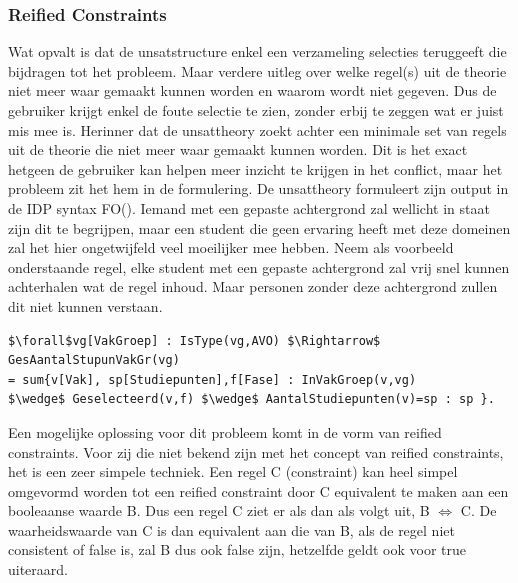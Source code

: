 \subsubsection{Reified Constraints}
\label{sec:reifiedconstraints}
Wat opvalt is dat de unsatstructure enkel een verzameling selecties teruggeeft die bijdragen tot het probleem. Maar verdere uitleg over welke regel(s) uit de theorie niet meer waar gemaakt kunnen worden en waarom wordt niet gegeven. Dus de gebruiker krijgt enkel de foute selectie te zien, zonder erbij te zeggen wat er juist mis mee is. Herinner dat de unsattheory zoekt achter een minimale set van regels uit de theorie die niet meer waar gemaakt kunnen worden. Dit is het exact hetgeen de gebruiker kan helpen meer inzicht te krijgen in het conflict, maar het probleem zit het hem in de formulering. De unsattheory formuleert zijn output in de IDP syntax FO(\textperiodcentered). Iemand met een gepaste achtergrond zal wellicht in staat zijn dit te begrijpen, maar een student die geen ervaring heeft met deze domeinen zal het hier ongetwijfeld veel moeilijker mee hebben. Neem als voorbeeld onderstaande regel, elke student met een gepaste achtergrond zal vrij snel kunnen achterhalen wat de regel inhoud. Maar personen zonder deze achtergrond zullen dit niet kunnen verstaan.
\lstset{basicstyle=\scriptsize}
\begin{lstlisting}[mathescape, caption=Voorbeeld constraint IDP\label{lst:constraint}, frame=single]
$\forall$vg[VakGroep] : IsType(vg,AVO) $\Rightarrow$ GesAantalStupunVakGr(vg) 
= sum{v[Vak], sp[Studiepunten],f[Fase] : InVakGroep(v,vg) 
$\wedge$ Geselecteerd(v,f) $\wedge$ AantalStudiepunten(v)=sp : sp }.
\end{lstlisting}
Een mogelijke oplossing voor dit probleem komt in de vorm van reified constraints. Voor zij die niet bekend zijn met het concept van reified constraints, het is een zeer simpele techniek. Een regel C (constraint) kan heel simpel omgevormd worden tot een reified constraint door C equivalent te maken aan een booleaanse waarde B. Dus een regel C ziet er als dan als volgt uit, B $\Leftrightarrow$ C. De waarheidswaarde van C is dan equivalent aan die van B, als de regel niet consistent of false is, zal B dus ook false zijn, hetzelfde geldt ook voor true uiteraard. 

